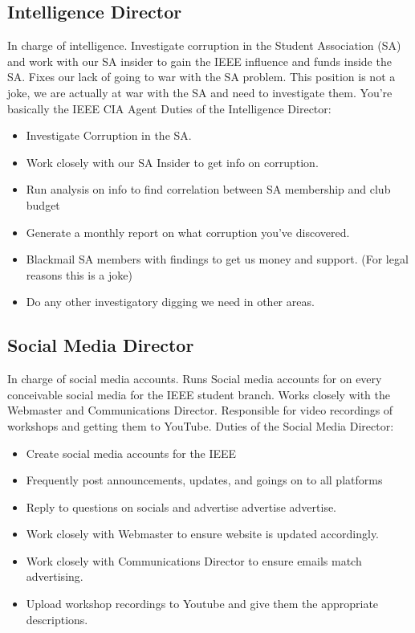 \documentclass{article}
\begin{document}
\subsection{Intelligence Director}
In charge of intelligence. Investigate corruption in the Student Association (SA) and work with our SA insider to gain the IEEE influence and funds inside the SA. Fixes our lack of going to war with the SA problem. This position is not a joke, we are actually at war with the SA and need to investigate them. You're basically the IEEE CIA Agent
\newline
\newline
Duties of the Intelligence Director:
\begin{itemize}
    \item Investigate Corruption in the SA.
    \item Work closely with our SA Insider to get info on corruption.
    \item Run analysis on info to find correlation between SA membership and club budget
    \item Generate a monthly report on what corruption you've discovered.
    \item Blackmail SA members with findings to get us money and support. (For legal reasons this is a joke)  
    \item Do any other investigatory digging we need in other areas.
\end{itemize}
\subsection{Social Media Director}
In charge of social media accounts. Runs Social media accounts for on every conceivable social media for the IEEE student branch. Works closely with the Webmaster and Communications Director. Responsible for
video recordings of workshops and getting them to YouTube.
\newline
\newline
Duties of the Social Media Director:
\begin{itemize}
    \item Create social media accounts for the IEEE
    \item Frequently post announcements, updates, and goings on to all platforms
    \item Reply to questions on socials and advertise advertise advertise. 
    \item Work closely with Webmaster to ensure website is updated accordingly. 
    \item Work closely with Communications Director to ensure emails match advertising.
    \item Upload workshop recordings to Youtube and give them the appropriate descriptions.
\end{itemize}
\end{document}

